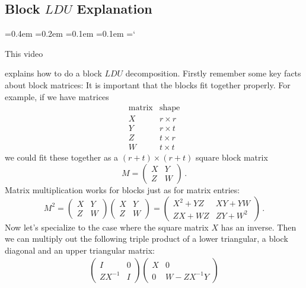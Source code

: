 
\subsection*{Block $LDU$ Explanation}

{\ttfamily
{}\font=0.4em
\font=0.2em
\font=0.1em
\font=0.1em
\hyphenchar\font=`\-


\hypertarget{scripts_lu_decomposition_blocks}{This video} explains how to do a block $LDU$ decomposition.
Firstly remember some key facts about block matrices: It is important that the blocks fit together properly.
For example, if we have matrices
\[
\begin{array}{c|c} \mbox{matrix}&\mbox{shape}\\\hline
X&r\times r\\
Y&r\times t\\
Z&t\times r\\
W& t\times t
\end{array}
\]
we could fit these together as a $(r+t)\times(r+t)$ square block matrix
\[
M=\left(\begin{array}{c|c}X&Y\\\hline Z&W\end{array}\right)\, .
\]
Matrix multiplication works for blocks just as for matrix entries:
\[
M^2 = \left(\begin{array}{c|c}X&Y\\\hline Z&W\end{array}\right)\left(\begin{array}{c|c}X&Y\\\hline Z&W\end{array}\right)
=\left(\begin{array}{c|c}X^2 + YZ&XY+YW\\\hline ZX+WZ&ZY+W^2\end{array}\right)\, .
\]
Now let's specialize to the case where the square matrix $X$ has an inverse. Then we can multiply out the following triple product of a lower triangular, a block diagonal and an
upper triangular matrix:
\begin{gather*}
\left(\begin{array}{c|c}I&0\\\hline ZX^{-1}&I\end{array}\right)\left(\begin{array}{c|c}X&0\\\hline 0&W-ZX^{-1}Y\end{array}\right)

\end{gather*}}
